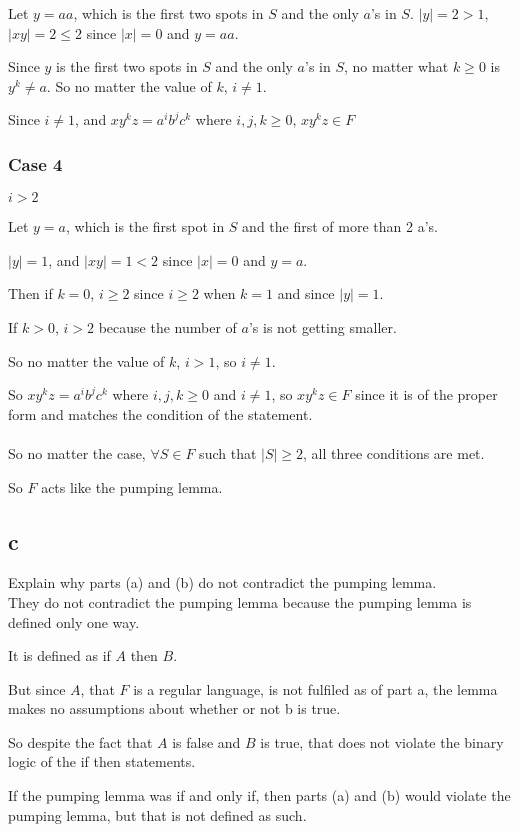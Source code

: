 \documentclass[letterpaper, 11pt]{article}
\begin{document}
Let $y = aa$, which is the first two spots in $S$ and the only $a$'s in $S$.
$|y| = 2 > 1$, $|xy| = 2 \leq 2$ since $|x| = 0$ and $y = aa$.

Since $y$ is the first two spots in $S$ and the only $a$'s in $S$, no matter what $k \geq 0$ is $y^k \neq a$.
So no matter the value of $k$, $i \neq 1$.

Since $i \neq 1$, and $xy^kz = a^ib^jc^k$ where $i, j, k \geq 0$, $xy^kz \in F$
\subsubsection*{Case 4}
$i > 2$

Let $y = a$, which is the first spot in $S$ and the first of more than 2 a's.

$|y| = 1$, and $|xy| = 1 < 2$ since $|x| = 0$ and $y = a$.

Then if $k = 0$, $i \geq 2$ since $i \geq 2$ when $k = 1$ and since $|y| = 1$.

If $k > 0$, $i > 2$ because the number of $a$'s is not getting smaller.

So no matter the value of $k$, $i > 1$, so $i \neq 1$.

So $xy^kz = a^ib^jc^k$ where $i, j, k \geq 0$ and $i \neq 1$, so $xy^kz \in F$ since it is of the proper form and matches the condition of the statement.\\\\

So no matter the case, $\forall S \in F$ such that $|S| \geq 2$, all three conditions are met.

So $F$ acts like the pumping lemma.
\subsection*{c}
Explain why parts (a) and (b) do not contradict the pumping lemma.\\

They do not contradict the pumping lemma because the pumping lemma is defined only one way.

It is defined as if $A$ then $B$.

But since $A$, that $F$ is a regular language, is not fulfiled as of part a, the lemma makes no assumptions about whether or not b is true.

So despite the fact that $A$ is false and $B$ is true, that does not violate the binary logic of the if then statements.

If the pumping lemma was if and only if, then parts (a) and (b) would violate the pumping lemma, but that is not defined as such.
\newpage
\end{document}
